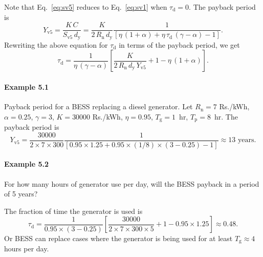 Note that Eq.~\eqref{eq:sv5} reduces to Eq.~\eqref{eq:sv1} when $\tau_{\text{d}} = 0$.
The payback period is
\begin{equation}
    Y_\text{v5} = \frac{K \, C}{S_\text{v5} \, d_\text{y}} 
    = \frac{K}{2 \, R_\text{n} \, d_\text{y}} \frac{1}{\left[  \eta \, (1 + \alpha) +
    \eta \, \tau_{\text{d}} \, (\gamma - \alpha) -  1 \right]}. \label{eq:pb5}
\end{equation}
Rewriting the above equation for $\tau_{\text{d}}$ in terms of the payback period,
we get
\begin{equation}
    \tau_{\text{d}} = \frac{1}{\eta \, (\gamma - \alpha)} \left[ 
    \frac{K}{2 \, R_\text{n} \, d_\text{y} \, Y_{\text{v5}}} + 1 
    - \eta \, (1 + \alpha) \right].
\end{equation}

\paragraph{Example 5.1} Payback period for a BESS replacing a diesel generator.
Let $R_{\text{n}} = 7$ Rs./kWh, $\alpha = 0.25$, $\gamma = 3$, $K=30000$ Rs./kWh,
$\eta = 0.95$, $T_{\text{g}} = 1 $~hr, $T_\text{p}=8$~hr. The payback period is
\begin{equation}
    Y_\text{v5} = \frac{30000}{2 \times 7 \times 300} 
    \frac{1}{[0.95 \times 1.25 + 0.95 \times (1/8) \times (3 - 0.25) - 1]} 
    \approx 13 \text{ years}.
\end{equation}

\paragraph{Example 5.2} For how many hours of generator use per day, will the BESS
payback in a period of 5 years?

The fraction of time the generator is used is
\begin{equation}
    \tau_{\text{d}} = \frac{1}{0.95 \times (3 - 0.25)} \left[ 
    \frac{30000}{2 \times 7 \times 300 \times 5} + 1 
    - 0.95 \times 1.25 \right] \approx 0.48.
\end{equation}
Or BESS can replace cases where the generator is being used for at least 
$T_\text{g} \approx 4$ hours per day.

